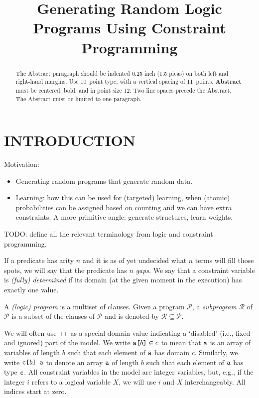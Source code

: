 \documentclass[letterpaper]{article}
\title{Generating Random Logic Programs Using Constraint Programming}
\author{} %
\theoremstyle{definition}
\newcommand{\variable}[1]{\texttt{\textup{#1}}}
\newcommand{\arrayd}[3]{\variable{{#1}[}{#2}\variable{]} \in {#3}}
\newcommand{\arrayt}[3]{\variable{{#3}[}{#2}\variable{] {#1}}}
\begin{document}

\maketitle

\begin{abstract}
The Abstract paragraph should be indented 0.25 inch (1.5 picas) on
both left and right-hand margins. Use 10~point type, with a vertical
spacing of 11~points.  {\bf Abstract} must be centered, bold, and in
point size 12. Two line spaces precede the Abstract. The Abstract must
be limited to one paragraph.
\end{abstract}

\section{INTRODUCTION}

Motivation:
\begin{itemize}
\item Generating random programs that generate random data.
\item Learning: how this can be used for (targeted) learning, when (atomic)
  probabilities can be assigned based on counting and we can have extra
  constraints. A more primitive angle: generate structures, learn weights.
\end{itemize}

TODO: define all the relevant terminology from logic and constraint programming.

If a predicate has arity $n$ and it is as of yet undecided what $n$ terms will
fill those spots, we will say that the predicate has $n$ \emph{gaps}. We say
that a constraint variable is \emph{(fully) determined} if its domain (at the
given moment in the execution) has exactly one value.

A \emph{(logic) program} is a multiset of clauses. Given a program
$\mathscr{P}$, a \emph{subprogram} $\mathscr{R}$ of $\mathscr{P}$ is a subset of
the clauses of $\mathscr{P}$ and is denoted by $\mathscr{R} \subseteq
\mathscr{P}$.

We will often use $\Box$ as a special domain value indicating a `disabled'
(i.e., fixed and ignored) part of the model. We write $\arrayd{a}{b}{c}$ to mean
that $\variable{a}$ is an array of variables of length $b$ such that each
element of $\variable{a}$ has domain $c$. Similarly, we write $\arrayt{a}{b}{c}$
to denote an array $\variable{a}$ of length $b$ such that each element of
$\variable{a}$ has type $\variable{c}$. All constraint variables in the model
are integer variables, but, e.g., if the integer $i$ refers to a logical
variable $X$, we will use $i$ and $X$ interchangeably. All indices start at
zero.
\end{document}

